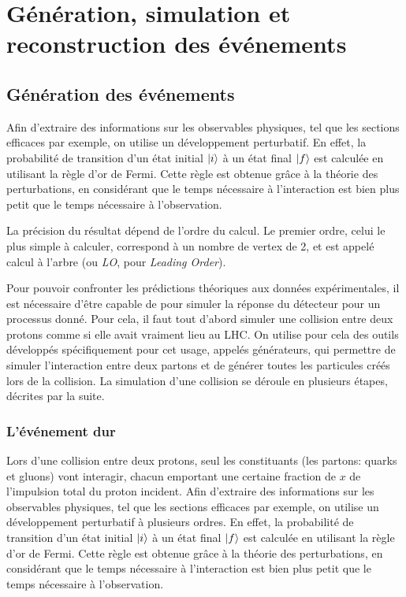 \chapter{Génération, simulation et reconstruction des événements}

\section{Génération des événements}

Afin d'extraire des informations sur les observables physiques, tel que les sections efficaces par exemple, on utilise un développement perturbatif. En effet, la probabilité de transition d'un état initial $\ket{i}$ à un état final $\ket{f}$ est calculée en utilisant la règle d'or de Fermi. Cette règle est obtenue grâce à la théorie des perturbations, en considérant que le temps nécessaire à l'interaction est bien plus petit que le temps nécessaire à l'observation.

La précision du résultat dépend de l'ordre du calcul. Le premier ordre, celui le plus simple à calculer, correspond à un nombre de vertex de 2, et est appelé calcul à l'arbre (ou \emph{LO}, pour \emph{Leading Order}).

Pour pouvoir confronter les prédictions théoriques aux données expérimentales, il est nécessaire d'être capable de pour simuler la réponse du détecteur pour un processus donné. Pour cela, il faut tout d'abord simuler une collision entre deux protons comme si elle avait vraiment lieu au LHC. On utilise pour cela des outils développés spécifiquement pour cet usage, appelés générateurs, qui permettre de simuler l'interaction entre deux partons et de générer toutes les particules créés lors de la collision. La simulation d'une collision se déroule en plusieurs étapes, décrites par la suite.

\subsection{L'événement dur}

Lors d'une collision entre deux protons, seul les constituants (les partons: quarks et gluons) vont interagir, chacun emportant une certaine fraction de $x$ de l'impulsion total du proton incident. Afin d'extraire des informations sur les observables physiques, tel que les sections efficaces par exemple, on utilise un développement perturbatif à plusieurs ordres. En effet, la probabilité de transition d'un état initial $\ket{i}$ à un état final $\ket{f}$ est calculée en utilisant la règle d'or de Fermi. Cette règle est obtenue grâce à la théorie des perturbations, en considérant que le temps nécessaire à l'interaction est bien plus petit que le temps nécessaire à l'observation.

